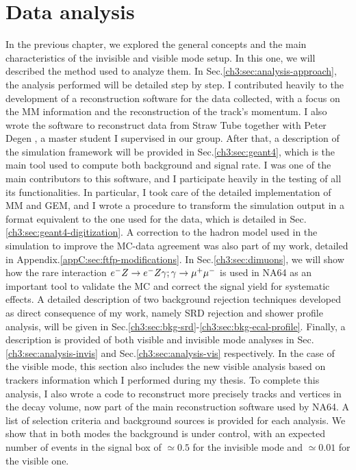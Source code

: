 
\newcommand{\pdirthree}{chapters/plots/chapter3}

\chapter{Data analysis}
\label{chapter3}


In the previous chapter, we explored the general concepts and the main characteristics of the invisible and visible mode setup. In this one, we will described the method used to analyze them. In Sec.\ref{ch3:sec:analysis-approach}, the analysis performed will be detailed step by step. I contributed heavily to the development of a reconstruction software for the data collected, with a focus on the MM information and the reconstruction of the track's momentum. I also wrote the software to reconstruct data from Straw Tube together with Peter Degen \cite{pdegen-thesis}, a master student I supervised in our group. After that, a description of the simulation framework will be provided in Sec.\ref{ch3:sec:geant4}, which is the main tool used to compute both background and signal rate. I was one of the main contributors to this software, and I participate heavily in the testing of all its functionalities. In particular, I took care of the detailed implementation of MM and GEM, and I wrote a procedure to transform the simulation output in a format equivalent to the one used for the data, which is detailed in Sec.\ref{ch3:sec:geant4-digitization}. A correction to the hadron model used in the simulation to improve the MC-data agreement was also part of my work, detailed in Appendix.\ref{appC:sec:ftfp-modifications}.
In Sec.\ref{ch3:sec:dimuons}, we will show how the rare interaction $e^- Z \to e^- Z \gamma; \gamma \to \mu^+ \mu^-$ is used in NA64 as an important tool to validate the MC and correct the signal yield for systematic effects.
A detailed description of two background rejection techniques developed as direct consequence of my work, namely SRD rejection and shower profile analysis, will be given in Sec.\ref{ch3:sec:bkg-srd}-\ref{ch3:sec:bkg-ecal-profile}.
Finally, a description is provided of both visible and invisible mode analyses in Sec.\ref{ch3:sec:analysis-invis} and Sec.\ref{ch3:sec:analysis-vis} respectively. In the case of the visible mode, this section also includes the new visible analysis based on trackers information which I performed during my thesis. To complete this analysis, I also wrote a code to reconstruct more precisely tracks and vertices in the decay volume, now part of the main reconstruction software used by NA64.
A list of selection criteria and background sources is provided for each analysis. We show that in both modes the background is under control, with an expected number of events in the signal box of $\simeq 0.5$ for the invisible mode and $\simeq 0.01$ for the visible one.


